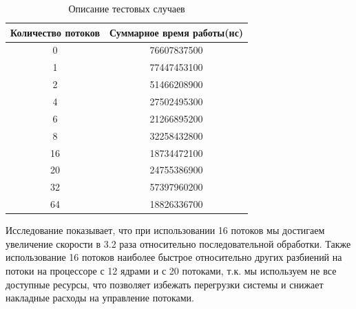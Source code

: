 \begin{table}[h]
    \begin{center}
        \begin{threeparttable}
    \caption{Описание тестовых случаев}
    \captionsetup{justification=raggedright, singlelinecheck=false}
    \label{tbl:mes}
    \begin{tabular}{|c|c|}
        \hline
        \textbf{Количество потоков} & \textbf{Суммарное время работы(нс)} \\
        \hline
        0 & 76607837500 \\
        \hline
        1 & 77447453100 \\
        \hline
        2 & 51466208900 \\
        \hline
        4 & 27502495300 \\
        \hline
        6 & 21266895200 \\
        \hline
        8 & 32258432800 \\
        \hline
        16 & 18734472100 \\
        \hline
        20 & 24755386900 \\
        \hline
        32 & 57397960200 \\
        \hline
        64 & 18826336700 \\
        \hline
    \end{tabular}
    \end{threeparttable}
    \end{center}
\end{table}

Исследование показывает, что при использовании 16 потоков мы достигаем увеличение скорости в 3.2 раза относительно последовательной обработки. Также использование 16 потоков наиболее быстрое относительно других разбиений на потоки на процессоре с 12 ядрами и с 20 потоками, т.к. мы используем не все доступные ресурсы, что позволяет избежать перегрузки системы и снижает накладные расходы на управление потоками.

\clearpage